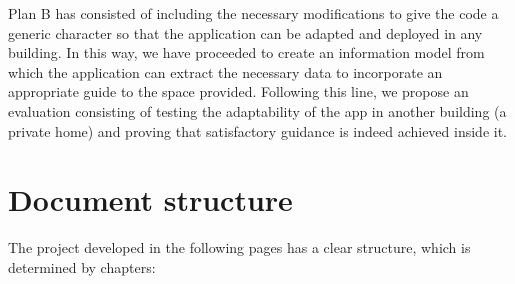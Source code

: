 Plan B has consisted of including the necessary modifications to give the code a generic character so that the application can be adapted and deployed in any building. In this way, we have proceeded to create an information model from which the application can extract the necessary data to incorporate an appropriate guide to the space provided. Following this line, we propose an evaluation consisting of testing the adaptability of the app in another building (a private home) and proving that satisfactory guidance is indeed achieved inside it.


\section{Document structure}

The project developed in the following pages has a clear structure, which is determined by chapters:

